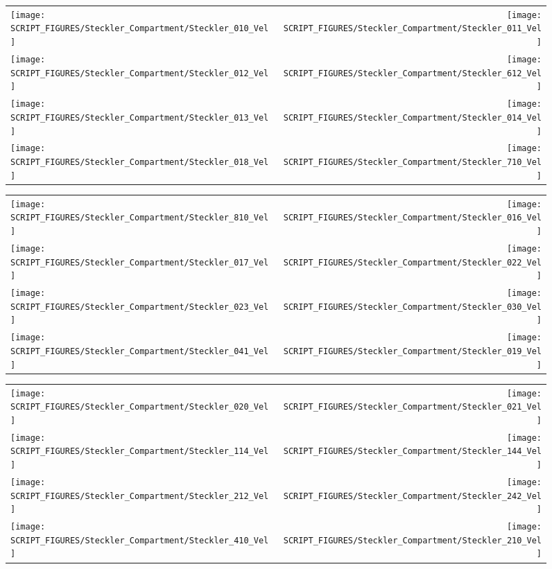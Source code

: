 \newpage

\begin{figure}[p]
\begin{tabular*}{\textwidth}{l@{\extracolsep{\fill}}r}
\texttt{[image: SCRIPT\_FIGURES/Steckler\_Compartment/Steckler\_010\_Vel]} &
\texttt{[image: SCRIPT\_FIGURES/Steckler\_Compartment/Steckler\_011\_Vel]} \\
\texttt{[image: SCRIPT\_FIGURES/Steckler\_Compartment/Steckler\_012\_Vel]} &
\texttt{[image: SCRIPT\_FIGURES/Steckler\_Compartment/Steckler\_612\_Vel]} \\
\texttt{[image: SCRIPT\_FIGURES/Steckler\_Compartment/Steckler\_013\_Vel]} &
\texttt{[image: SCRIPT\_FIGURES/Steckler\_Compartment/Steckler\_014\_Vel]} \\
\texttt{[image: SCRIPT\_FIGURES/Steckler\_Compartment/Steckler\_018\_Vel]} &
\texttt{[image: SCRIPT\_FIGURES/Steckler\_Compartment/Steckler\_710\_Vel]}
\end{tabular*}
\label{Steckler_Vel_1}
\end{figure}

\begin{figure}[p]
\begin{tabular*}{\textwidth}{l@{\extracolsep{\fill}}r}
\texttt{[image: SCRIPT\_FIGURES/Steckler\_Compartment/Steckler\_810\_Vel]} &
\texttt{[image: SCRIPT\_FIGURES/Steckler\_Compartment/Steckler\_016\_Vel]} \\
\texttt{[image: SCRIPT\_FIGURES/Steckler\_Compartment/Steckler\_017\_Vel]} &
\texttt{[image: SCRIPT\_FIGURES/Steckler\_Compartment/Steckler\_022\_Vel]} \\
\texttt{[image: SCRIPT\_FIGURES/Steckler\_Compartment/Steckler\_023\_Vel]} &
\texttt{[image: SCRIPT\_FIGURES/Steckler\_Compartment/Steckler\_030\_Vel]} \\
\texttt{[image: SCRIPT\_FIGURES/Steckler\_Compartment/Steckler\_041\_Vel]} &
\texttt{[image: SCRIPT\_FIGURES/Steckler\_Compartment/Steckler\_019\_Vel]}
\end{tabular*}
\label{Steckler_Vel_2}
\end{figure}

\begin{figure}[p]
\begin{tabular*}{\textwidth}{l@{\extracolsep{\fill}}r}
\texttt{[image: SCRIPT\_FIGURES/Steckler\_Compartment/Steckler\_020\_Vel]} &
\texttt{[image: SCRIPT\_FIGURES/Steckler\_Compartment/Steckler\_021\_Vel]} \\
\texttt{[image: SCRIPT\_FIGURES/Steckler\_Compartment/Steckler\_114\_Vel]} &
\texttt{[image: SCRIPT\_FIGURES/Steckler\_Compartment/Steckler\_144\_Vel]} \\
\texttt{[image: SCRIPT\_FIGURES/Steckler\_Compartment/Steckler\_212\_Vel]} &
\texttt{[image: SCRIPT\_FIGURES/Steckler\_Compartment/Steckler\_242\_Vel]} \\
\texttt{[image: SCRIPT\_FIGURES/Steckler\_Compartment/Steckler\_410\_Vel]} &
\texttt{[image: SCRIPT\_FIGURES/Steckler\_Compartment/Steckler\_210\_Vel]}
\end{tabular*}
\label{Steckler_Vel_3}
\end{figure}

